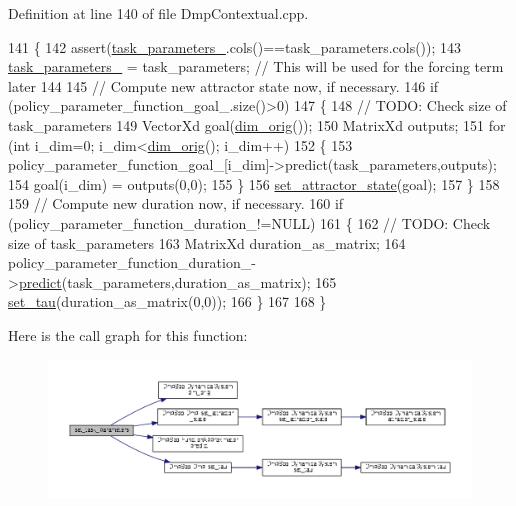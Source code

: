 Definition at line 140 of file Dmp\+Contextual.\+cpp.


\begin{DoxyCode}
141 \{
142   assert(\hyperlink{classDmpBbo_1_1DmpContextual_af0d2e6fef248e131b92fc244b55b50c6}{task\_parameters\_}.cols()==task\_parameters.cols());
143   \hyperlink{classDmpBbo_1_1DmpContextual_af0d2e6fef248e131b92fc244b55b50c6}{task\_parameters\_} = task\_parameters; \textcolor{comment}{// This will be used for the forcing term later}
144   
145   \textcolor{comment}{// Compute new attractor state now, if necessary.}
146   \textcolor{keywordflow}{if} (policy\_parameter\_function\_goal\_.size()>0)
147   \{ 
148     \textcolor{comment}{// TODO: Check size of task\_parameters}
149     VectorXd goal(\hyperlink{group__DynamicalSystems_ga93d7cbbf2e471b00f124e41706405a05}{dim\_orig}());
150     MatrixXd outputs;
151     \textcolor{keywordflow}{for} (\textcolor{keywordtype}{int} i\_dim=0; i\_dim<\hyperlink{group__DynamicalSystems_ga93d7cbbf2e471b00f124e41706405a05}{dim\_orig}(); i\_dim++)
152     \{
153       policy\_parameter\_function\_goal\_[i\_dim]->predict(task\_parameters,outputs);
154       goal(i\_dim) = outputs(0,0);
155     \}
156     \hyperlink{classDmpBbo_1_1Dmp_a6dccbd077acfd148f528a48a72a4003f}{set\_attractor\_state}(goal);
157   \}
158   
159   \textcolor{comment}{// Compute new duration now, if necessary.}
160   \textcolor{keywordflow}{if} (policy\_parameter\_function\_duration\_!=NULL)
161   \{
162     \textcolor{comment}{// TODO: Check size of task\_parameters}
163     MatrixXd duration\_as\_matrix;
164     policy\_parameter\_function\_duration\_->\hyperlink{classDmpBbo_1_1FunctionApproximator_a0547681a81d4c43ce2601f16047baf7a}{predict}(task\_parameters,duration\_as\_matrix);
165     \hyperlink{classDmpBbo_1_1Dmp_a17edb45ef62a4ef7f8c78e4f8f68b249}{set\_tau}(duration\_as\_matrix(0,0));
166   \}
167   
168 \}
\end{DoxyCode}


Here is the call graph for this function\+:
\nopagebreak
\begin{figure}[H]
\begin{center}
\leavevmode
\includegraphics[width=350pt]{classDmpBbo_1_1DmpContextual_a8b284cae90015038c405e257ffaed70e_cgraph}
\end{center}
\end{figure}


